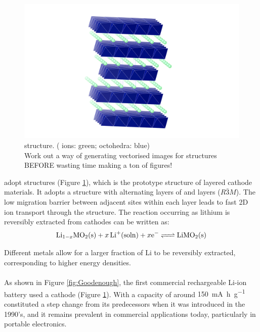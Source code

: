 \subsection{}
\begin{figure}
\centering
\includegraphics[width=\linewidth]{figures/structures/LiCoO2}
\caption[ structure]{ structure. ( ions: green;  octohedra: blue)\\ {\color{red} Work out a way of generating vectorised images for structures BEFORE wasting time making a ton of figures!}}
\label{fig:LCO}
\end{figure}
 adopt  structures (Figure \ref{fig:LCO}), which is the prototype structure of  layered cathode materials.
It adopts a structure with alternating layers of \ce{[CoO2]-} and  layers ($R\bar{3}M$).\cite{Islam2014}
The low migration barrier between adjacent  sites within each layer leads to fast 2D ion transport through the structure.
The reaction occurring as lithium is reversibly extracted from  cathodes can be written as:\cite{Islam2014}
\begin{equation}
\ce{Li_{1-x}MO2(s) +$x$Li+(soln) +$x$e- <=> LiMO2(s)}
\end{equation}

Different metals allow for a larger fraction of Li to be reversibly extracted, corresponding to higher energy densities.

\paragraph{}

As shown in Figure \ref{fig:Goodenough}, the first commercial rechargeable Li-ion battery used a  cathode (Figure \ref{fig:LCO}).
With a capacity of around {\color{red}\SI{150}{\milli\ampere\hour\per\gram}} constituted a step change from its predecessors when it was introduced in the 1990's, and it remains prevalent in commercial applications today, particularly in portable electronics.

